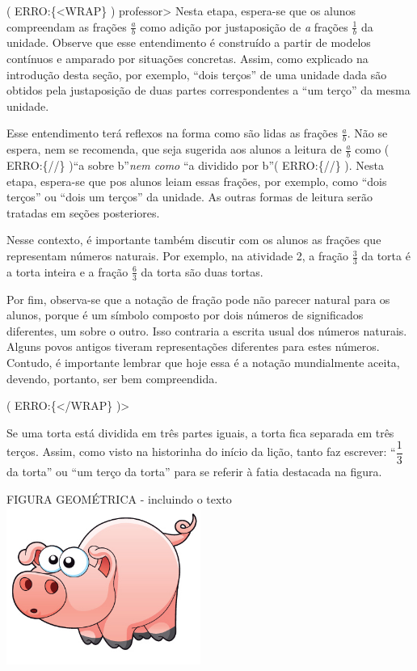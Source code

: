 \documentclass[a4,12pt]{book}
\newcounter{atividade}
\begin{document}
( ERRO:\{<WRAP\} ) professor>
Nesta etapa, espera-se que os alunos compreendam as frações $\frac{a}{b}$ como adição por justaposição de {\it a} frações $\frac{1}{b}$ da unidade. Observe que esse entendimento é construído a partir de modelos contínuos e amparado por situações concretas. Assim, como explicado na introdução desta seção, por exemplo, ``dois terços'' de uma unidade dada são obtidos pela justaposição de duas partes correspondentes a ``um terço'' da mesma unidade.

Esse entendimento terá reflexos na forma como são lidas as frações $\frac{a}{b}$. Não se espera, nem se recomenda, que seja sugerida aos alunos a leitura de $\frac{a}{b}$ como ( ERRO:\{//\} )``a sobre b''{\it  nem como }``a dividido por b''( ERRO:\{//\} ). Nesta etapa, espera-se que pos alunos leiam essas frações, por exemplo, como ``dois terços'' ou ``dois um terços'' da unidade. As outras formas de leitura serão tratadas em seções posteriores.

Nesse contexto, é importante também discutir com os alunos as frações que representam números naturais. Por exemplo, na atividade 2, a fração $\frac{3}{3}$ da torta é a torta inteira e a fração $\frac{6}{3}$ da torta são duas tortas.

Por fim, observa-se que a notação de fração pode não parecer natural para os alunos, porque é um símbolo composto por dois números de significados diferentes, um sobre o outro. Isso contraria a escrita usual dos números naturais. Alguns povos antigos tiveram representações diferentes para estes números.  Contudo, é importante lembrar que hoje essa é a notação mundialmente aceita, devendo, portanto, ser bem compreendida.

( ERRO:\{</WRAP\} )>


Se uma torta está dividida em três partes iguais, a torta fica separada em três terços. Assim, como visto na historinha do início da lição, tanto faz escrever: ``$\dfrac{1}{3}$ da torta'' ou ``um terço da torta'' para se referir à fatia destacada na figura.

\begin{imagem*}[breakable]{}{}   FIGURA GEOMÉTRICA - incluindo o texto  \mbox{} \newline        \includegraphics[width=180pt, keepaspectratio]{pig}\end{imagem*}
\end{document}

